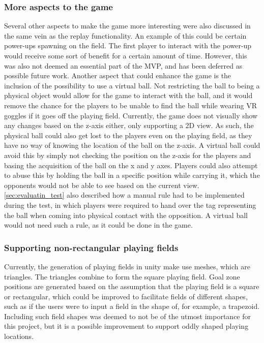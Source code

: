 \subsubsection{More aspects to the game}
Several other aspects to make the game more interesting were also discussed in the same vein as the replay functionality.
An example of this could be certain power-ups spawning on the field.
The first player to interact with the power-up would receive some sort of benefit for a certain amount of time.
However, this was also not deemed an essential part of the MVP, and has been deferred as possible future work.
Another aspect that could enhance the game is the inclusion of the possibility to use a virtual ball.
Not restricting the ball to being a physical object would allow for the game to interact with the ball, and it would remove the chance for the players to be unable to find the ball while wearing VR goggles if it goes off the playing field.
Currently, the game does not visually show any changes based on the z-axis either, only supporting a 2D view.
As such, the physical ball could also get lost to the players even on the playing field, as they have no way of knowing the location of the ball on the z-axis.
A virtual ball could avoid this by simply not checking the position on the z-axis for the players and basing the acquisition of the ball on the x and y axes.
Players could also attempt to abuse this by holding the ball in a specific position while carrying it, which the opponents would not be able to see based on the current view.
\autoref{sec:evaluatin_test} also described how a manual rule had to be implemented during the test, in which players were required to hand over the tag representing the ball when coming into physical contact with the opposition.
A virtual ball would not need such a rule, as it could be done in the game.

\subsubsection{Supporting non-rectangular playing fields}
Currently, the generation of playing fields in unity make use meshes, which are triangles.
The triangles combine to form the square playing field.
Goal zone positions are generated based on the assumption that the playing field is a square or rectangular, which could be improved to facilitate fields of different shapes, such as if the users were to input a field in the shape of, for example, a trapezoid.
Including such field shapes was deemed to not be of the utmost importance for this project, but it is a possible improvement to support oddly shaped playing locations.

